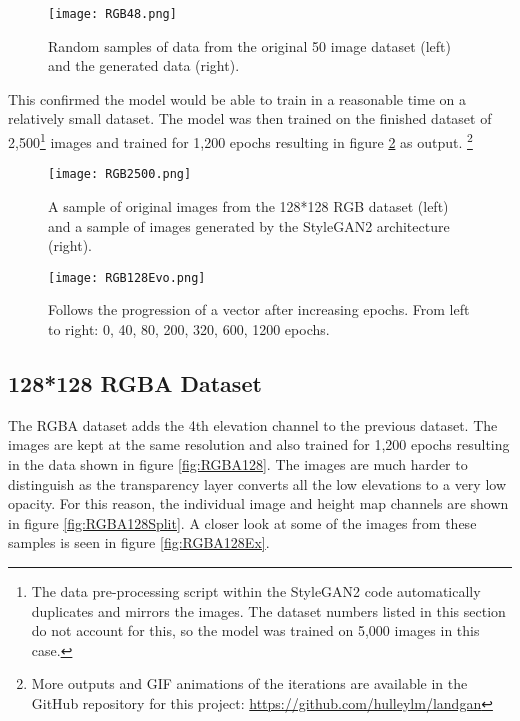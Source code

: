 \documentclass[a4paper]{report}
\begin{document}
\begin{figure}[H]
    \centering
        \texttt{[image: RGB48.png]}
        \caption{Random samples of data from the original 50 image dataset (left) and the generated data (right).}
        \label{fig:RGB48}
\end{figure}

This confirmed the model would be able to train in a reasonable time on a relatively small dataset. The model was then trained on the finished dataset of 2,500\footnote{The data pre-processing script within the StyleGAN2 code automatically duplicates and mirrors the images. The dataset numbers listed in this section do not account for this, so the model was trained on 5,000 images in this case.} images and trained for 1,200 epochs resulting in figure \ref{fig:RGB2500} as output. \footnote{More outputs and GIF animations of the iterations are available in the GitHub repository for this project: \url{https://github.com/hulleylm/landgan}}

\begin{figure}[H]
    \centering
        \texttt{[image: RGB2500.png]}
        \caption{A sample of original images from the 128*128 RGB dataset (left) and a sample of images generated by the StyleGAN2 architecture (right).}
        \label{fig:RGB2500}
\end{figure}

\begin{figure}[H]
    \centering
        \texttt{[image: RGB128Evo.png]}
        \caption{Follows the progression of a vector after increasing epochs. From left to right: 0, 40, 80, 200, 320, 600, 1200 epochs.}
        \label{fig:RGB2500Evo}
\end{figure}

\subsection{128*128 RGBA Dataset}
The RGBA dataset adds the 4th elevation channel to the previous dataset. The images are kept at the same resolution and also trained for 1,200 epochs resulting in the data shown in figure \ref{fig:RGBA128}. The images are much harder to distinguish as the transparency layer converts all the low elevations to a very low opacity. For this reason, the individual image and height map channels are shown in figure \ref{fig:RGBA128Split}. A closer look at some of the images from these samples is seen in figure \ref{fig:RGBA128Ex}.
\end{document}
